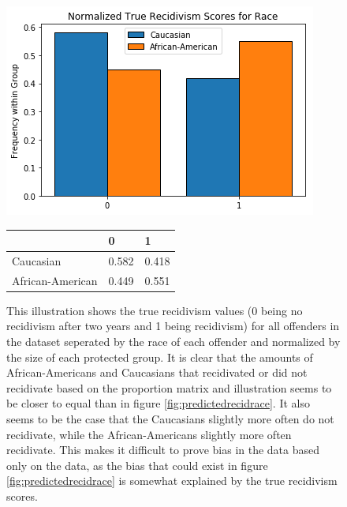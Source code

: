 \documentclass[11pt, fleqn, titlepage]{article}
\begin{document}
	
	\begin{figure}[H]
		\centering
		\includegraphics[width=0.5\linewidth]{imgs/true_normalized_race}
		\begin{table}[H]
			\centering
			\begin{tabular}{|l|l|l|}
				\hline
				& 0   & 1  \\ \hline
				Caucasian        & 0.582 & 0.418  \\ \hline
				African-American & 0.449 & 0.551  \\ \hline
			\end{tabular}
		\end{table}
		\caption{This illustration shows the true recidivism values (0 being no recidivism after two years and 1 being recidivism) for all offenders in the dataset seperated by the race of each offender and normalized by the size of each protected group. It is clear that the amounts of African-Americans and Caucasians that recidivated or did not recidivate based on the proportion matrix and illustration seems to be closer to equal than in figure \ref{fig:predictedrecidrace}. It also seems to be the case that the Caucasians slightly more often do not recidivate, while the African-Americans slightly more often recidivate. This makes it difficult to prove bias in the data based only on the data, as the bias that could exist in figure \ref{fig:predictedrecidrace} is somewhat explained by the true recidivism scores.}
		\label{fig:race_truerecid}
	\end{figure}
	
\end{document}
